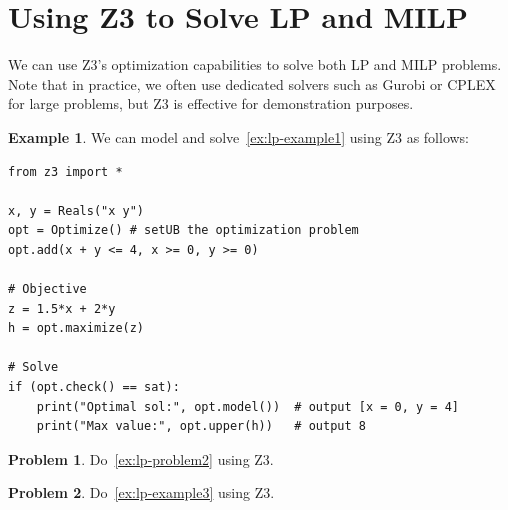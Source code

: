 \documentclass[oneside,11pt,dvipsnames]{book}
\numberwithin{equation}{section}
\theoremstyle{definition}
\newtheorem{example}{Example}[section]
\newtheorem{problem}{Problem}[section]
\theoremstyle{remark}
\begin{document}
\section{Using Z3 to Solve LP and MILP}

We can use Z3's optimization capabilities to solve both LP and MILP problems. Note that in practice, we often use dedicated solvers such as Gurobi or CPLEX for large problems, but Z3 is effective for demonstration purposes.

\begin{example}\label{ex:lp-z3}
    We can model and solve~\autoref{ex:lp-example1} using Z3 as follows:

    \begin{lstlisting}
from z3 import *

x, y = Reals("x y")
opt = Optimize() # setUB the optimization problem
opt.add(x + y <= 4, x >= 0, y >= 0)

# Objective
z = 1.5*x + 2*y
h = opt.maximize(z)

# Solve
if (opt.check() == sat):
    print("Optimal sol:", opt.model())  # output [x = 0, y = 4]
    print("Max value:", opt.upper(h))   # output 8
    \end{lstlisting}
\end{example}


\begin{problem}
Do~\autoref{ex:lp-problem2} using Z3.
\end{problem}

\begin{problem}
Do~\autoref{ex:lp-example3} using Z3.
\end{problem}
\end{document}
